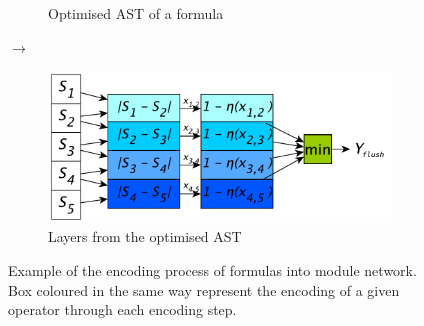 \begin{figure}
\begin{subfigure}[]{0.32\linewidth}
        \caption{Optimised AST of a formula}
        \label{fig:ast-kins-optimised}
    \end{subfigure}
    \hfill$\rightarrow$\hfill
    \begin{subfigure}[]{0.35\linewidth}
        \centering
        \includegraphics[width=\linewidth]{figures/net-flush.pdf}
        \caption{Layers from the optimised AST}
        \label{fig:net-kins-encoded}
    \end{subfigure}
    \caption{
        Example of the encoding process of formulas into module network.
        Box coloured in the same way represent the encoding of a given operator through each encoding step.
    }
    \label{fig:ast-kins}
\end{figure}
